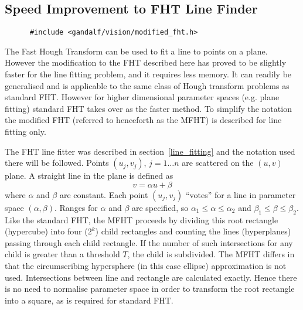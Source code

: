 \subsection{Speed Improvement to FHT Line Finder} \label{MFHT}
\begin{verbatim}
      #include <gandalf/vision/modified_fht.h>
\end{verbatim}
 The Fast Hough Transform can be used to fit a line to points on a plane.
 However the modification to the FHT described here has proved to be slightly
 faster for the line fitting problem, and it requires less memory.
 It can readily be generalised and is applicable to
 the same class of Hough transform problems as standard FHT.
 However for higher dimensional parameter spaces (e.g. plane fitting)
 standard FHT takes over as the faster method. To simplify the notation
 the modified FHT (referred to henceforth as the MFHT)
 is described for line fitting only.

 The FHT line fitter was described in section~\ref{line_fitting} and the
 notation used there will be followed. Points $(u_j,v_j)$, $j=1 \ldots n$
 are scattered on the $(u,v)$ plane. A straight line in the plane is defined as
 \[ v=\alpha u + \beta \]
 where $\alpha$ and $\beta$ are constant. Each point $(u_j,v_j)$ ``votes''
 for a line in parameter space $(\alpha , \beta )$.
 Ranges for $\alpha$ and $\beta$ are specified, so
 $\alpha_1 \leq \alpha \leq \alpha_2$ and $\beta_1 \leq \beta \leq \beta_2$.
 Like the standard FHT, the MFHT proceeds by dividing this root
 rectangle (hypercube) into four ($2^k$) child rectangles and counting the
 lines (hyperplanes) passing through each child rectangle. If the number of
 such intersections for any child is greater than a threshold $T$, the child
 is subdivided. The MFHT differs in that the circumscribing hypersphere
 (in this case ellipse) approximation is not used.
 Intersections between line and rectangle are calculated exactly.
 Hence there is no need to normalise parameter space in order to
 transform the root rectangle into a square, as is required for standard FHT.

